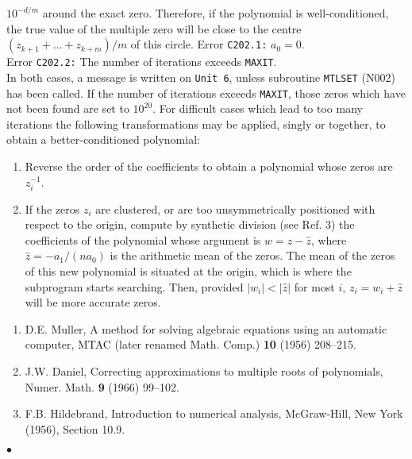 $10^{-d/m}$ around the exact zero. Therefore, if the polynomial is
well-conditioned, the true value of the multiple zero will be close to
the centre $(z_{k+1}+\ldots +z_{k+m})/m$ of this circle.
\Errorh
Error {\tt C202.1:} $a_0 = 0$. \\
Error {\tt C202.2:} The number of iterations exceeds {\tt MAXIT}. \\
In both cases, a message is written on {\tt Unit 6},
unless subroutine {\tt MTLSET} (N002) has been called.
If the number of iterations exceeds {\tt MAXIT}, those
zeros which have not been found are set to $10^{20}$.
\newpage
\Notes
For difficult cases which lead to too many iterations the following
transformations may be applied, singly or together, to obtain a
better-conditioned polynomial:
\begin{enumerate}
\item Reverse the order of the coefficients to obtain a polynomial
whose zeros are $z_i^{-1}$.
\item  If the zeros $z_i$ are clustered, or are too unsymmetrically
positioned with respect to the origin,
compute by synthetic division
(see Ref. 3) the coefficients of the polynomial whose argument is
$w=z-\widehat{z}$, where $\widehat{z} = -a_1/(n a_0)$ is the arithmetic
mean of the zeros. The mean of the zeros of this new polynomial is
situated at the origin, which is where the subprogram starts searching.
Then, provided $|w_i|<|\widehat{z}|$ for most $i$,
$z_i = w_i+\widehat{z}$ will be more accurate zeros.
\end{enumerate}
\Refer
\begin{enumerate}
\item  D.E. Muller, A method for solving algebraic equations using an
automatic computer, MTAC (later renamed Math. Comp.) {\bf 10} (1956)
208--215.
\item J.W. Daniel, Correcting approximations to multiple roots of
polynomials, Numer. Math. {\bf 9} (1966) 99--102.
\item F.B. Hildebrand, Introduction to numerical analysis,
McGraw-Hill, New York (1956), Section 10.9.
\end{enumerate}
$\bullet$
